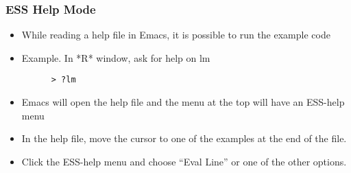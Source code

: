 \documentclass[11pt,english]{beamer}
\begin{document}
\begin{frame}
  \frametitle{ESS Help Mode}
  \begin{itemize}
  \item While reading a help file in Emacs, it is possible to run the example
    code
  \item Example. In {*}R{*} window, ask for help on lm


    \begin{lstlisting}
      > ?lm
    \end{lstlisting}


  \item Emacs will open the help file and the menu at the top will have an
    ESS-help menu
  \item In the help file, move the cursor to one of the examples at the end
    of the file.
  \item Click the ESS-help menu and choose ``Eval Line'' or one of the other
    options.
  \end{itemize}
\end{frame}
\end{document}
